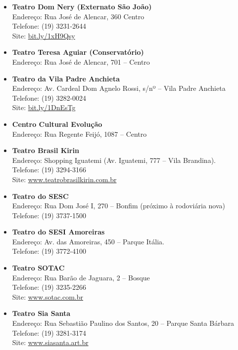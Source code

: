 \begin{itemize}
    \item   \textbf{Teatro Dom Nery (Externato São João)}
        \\Endereço: Rua José de Alencar, 360  Centro
        \\Telefone: (19) 3231-2644  %
        \\Site: \url{bit.ly/1xH9Qsy}

     \item   \textbf{Teatro Teresa Aguiar (Conservatório)}
         \\Endereço: Rua José de Alencar, 701 -- Centro

    \item   \textbf{Teatro da Vila Padre Anchieta}
        \\Endereço: Av. Cardeal Dom Agnelo Rossi, s/nº -- Vila Padre Anchieta
        \\Telefone: (19) 3282-0024
        \\Site: \url{bit.ly/1DnEsTg}

     \item   \textbf{Centro Cultural Evolução}
         \\Endereço: Rua Regente Feijó, 1087 -- Centro

    \item   \textbf{Teatro Brasil Kirin}
		\\Endereço: Shopping Iguatemi (Av. Iguatemi, 777 -- Vila Brandina).
		\\Telefone: (19) 3294-3166
		\\Site: \url{www.teatrobrasilkirin.com.br}

    \item   \textbf{Teatro do SESC}
		\\Endereço: Rua Dom José I, 270 -- Bonfim (próximo à rodoviária nova)
		\\Telefone: (19) 3737-1500

    \item   \textbf{Teatro do SESI Amoreiras}
		\\Endereço: Av. das Amoreiras, 450 -- Parque Itália.
		\\Telefone: (19) 3772-4100

    \item   \textbf{Teatro SOTAC}
		\\Endereço: Rua Barão de Jaguara, 2 -- Bosque
		\\Telefone: (19) 3235-2266
		\\Site: \url{www.sotac.com.br}

    \item   \textbf{Teatro Sia Santa}
		\\Endereço: Rua Sebastião Paulino dos Santos, 20 -- Parque Santa Bárbara
        \\Telefone: (19) 3281-3174
		\\Site: \url{www.siasanta.art.br}
\end{itemize}

